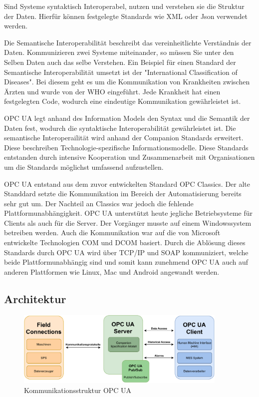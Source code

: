 \documentclass[a4paper, 12pt, oneside]{scrbook}
\begin{document}
	Sind Systeme syntaktisch Interoperabel, nutzen und verstehen sie die Struktur der Daten. Hierfür können festgelegte Standards wie XML oder Json verwendet werden. 
	
	Die Semantische Interoperabilität beschreibt das vereinheitlichte Verständnis der Daten. Kommunizieren zwei Systeme miteinander, so müssen Sie unter den Selben Daten auch das selbe Verstehen. Ein Beispiel für einen Standard der Semantische Interoperabilität umsetzt ist der "International Classification of Diseases". Bei diesem geht es um die Kommunikation von Krankheiten zwischen Ärzten und wurde von der WHO eingeführt. Jede Krankheit hat einen festgelegten Code, wodurch eine eindeutige Kommunikation gewährleistet ist.
	
	OPC UA legt anhand des Information Models den Syntax und die Semantik der Daten fest, wodurch die syntaktische Interoperabilität gewährleistet ist. Die semantische Interoperailität wird anhand der Companion Standards erweitert. Diese beschreiben Technologie-spezifische Informationsmodelle. Diese Standards entstanden durch intensive Kooperation und Zusammenarbeit mit Organisationen um die Standards möglichst umfassend aufzustellen. %
	
	OPC UA entstand aus dem zuvor entwickelten Standard OPC Classics. Der alte Standdard setzte die Kommunikation im Bereich der Automatisierung bereits sehr gut um. Der Nachteil an Classics war jedoch die fehlende Plattformunabhängigkeit. OPC UA unterstützt heute jegliche Betriebsysteme für Clients als auch für die Server. Der Vorgänger musste auf einem Windowssystem betreiben werden. Auch die Kommunikation war auf die von Microsoft entwickelte Technologien \ac{COM} und \ac{DCOM} basiert. Durch die Ablösung dieses Standards durch OPC UA wird über TCP/IP und SOAP kommuniziert, welche beide Plattformunabhängig sind und somit kann zunehmend OPC UA auch auf anderen Plattformen wie Linux, Mac und Android angewandt werden.
	
		\subsection{Architektur} %
		
		
		
		\begin{figure}[h]
			\centering
			\includegraphics[width=0.9\textwidth]{res/diagramms/OPCUA.pdf}
			\caption{Kommunikationsstruktur OPC UA}
			\label{fig:OPCUA}
		\end{figure}
		
\end{document}
